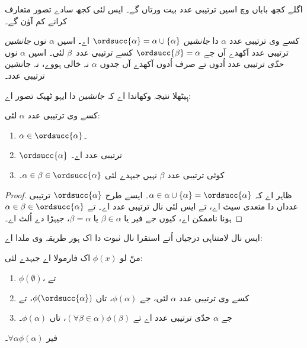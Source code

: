 \documentclass[../../../include/open-logic-section]{subfiles}
\begin{document}

اگلے کجھ باباں وچ اسیں ترتیبی عدد بہت ورتاں گے۔ ایس لئی کجھ سادے تصور
متعارف کرانے کم آؤن گے۔

\begin{defn}
کسے وی ترتیبی عدد $\alpha$ دا \emph{جانشین}
$\ordsucc{\alpha} =\alpha \cup \{\alpha\}$ اے۔
اسیں $\alpha$ نوں \emph{جانشین} ترتیبی عدد آکھدے آں جے
$\ordsucc{\beta} = \alpha$ کسے ترتیبی عدد~$\beta$ لئی۔
اسیں $\alpha$ نوں \emph{حدّی} ترتیبی عدد اُدوں تے صرف اُدوں آکھدے آں
جدوں $\alpha$ نہ خالی ہووے، نہ جانشین ترتیبی عدد۔
\end{defn}
\noindent
ہِیٹھلا نتیجہ وکھاندا اے کہ \emph{جانشین} دا ایہو ٹھیک تصور اے:

\begin{prop}
کسے وی ترتیبی عدد $\alpha$ لئی:
\begin{enumerate}
	\item $\alpha \in \ordsucc{\alpha}$۔
	\item $\ordsucc{\alpha}$ ترتیبی عدد اے۔
	\item کوئی ترتیبی عدد $\beta$ نہیں جیہدے لئی
	$\alpha \in \beta \in \ordsucc{\alpha}$۔
\end{enumerate}
\end{prop}

\begin{proof}
ظاہر اے کہ $\alpha \in \alpha \cup \{\alpha\} = \ordsucc{\alpha}$۔
ایسے طرح $\ordsucc{\alpha}$ ترتیبی عدداں دا متعدی سیٹ اے، تے ایس لئی
 نال ترتیبی عدد اے۔
تے $\alpha \in \beta \in \ordsucc{\alpha}$ ہونا ناممکن اے، کیوں جے
فیر یا $\beta \in \alpha$ یا $\beta = \alpha$، جیہڑا
 دے اُلٹ اے۔
\end{proof}
\noindent
ایس نال لامتناہی درجیاں اُتے استقرا نال ثبوت دا اک ہور طریقہ وی ملدا اے:

\begin{thm}
منّ لو $\phi(x)$ اک فارمولا اے جیہدے لئی:
\begin{enumerate}
	\item $\phi(\emptyset)$، تے
	\item کسے وی ترتیبی عدد $\alpha$ لئی، جے $\phi(\alpha)$، تاں
	$\phi(\ordsucc{\alpha})$، تے
	\item جے $\alpha$ حدّی ترتیبی عدد اے تے
	$(\forall \beta \in \alpha)\phi(\beta)$، تاں $\phi(\alpha)$۔
\end{enumerate}
فیر $\forall \alpha \phi(\alpha)$۔
\end{thm}
\end{document}
